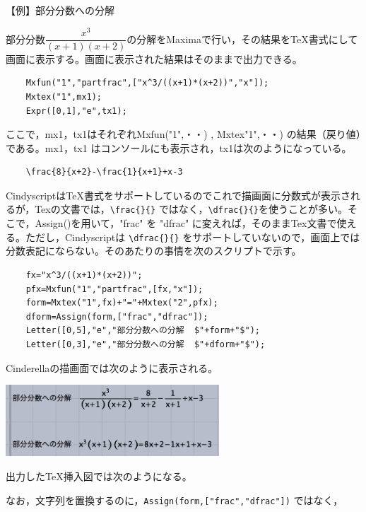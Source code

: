 \documentclass[papersize,a4paper,12pt,uplatex]{jsarticle}
\begin{document}
\begin{description}
\vspace{\baselineskip}
【例】部分分数への分解
\begin{spacing}{1.5}
  部分分数$\dfrac{x^3}{(x+1)(x+2)}$の分解をMaximaで行い，その結果をTeX書式にして画面に表示する。画面に表示された結果はそのまま\ketcindy で出力できる。
\end{spacing}
\begin{verbatim}
    Mxfun("1","partfrac",["x^3/((x+1)*(x+2))","x"]);
    Mxtex("1",mx1);
    Expr([0,1],"e",tx1);
\end{verbatim}
  ここで，mx1，tx1はそれぞれMxfun("1",・・) , Mxtex"1",・・) の結果（戻り値）である。mx1，tx1 はコンソールにも表示され，tx1は次のようになっている。
\begin{verbatim}
    \frac{8}{x+2}-\frac{1}{x+1}+x-3 
\end{verbatim}
  CindyscriptはTeX書式をサポートしているのでこれで描画面に分数式が表示されるが，Texの文書では，\verb|\frac{}{}| ではなく，\verb|\dfrac{}{}|を使うことが多い。そこで，Assign()を用いて，"frac" を "dfrac" に変えれば，そのままTex文書で使える。ただし，Cindyscriptは \verb|\dfrac{}{}| をサポートしていないので，画面上では分数表記にならない。そのあたりの事情を次のスクリプトで示す。
\begin{verbatim}
    fx="x^3/((x+1)*(x+2))";
    pfx=Mxfun("1","partfrac",[fx,"x"]);
    form=Mxtex("1",fx)+"="+Mxtex("2",pfx);
    dform=Assign(form,["frac","dfrac"]);
    Letter([0,5],"e","部分分数への分解  $"+form+"$");
    Letter([0,3],"e","部分分数への分解  $"+dform+"$");
\end{verbatim}
Cinderellaの描画面では次のように表示される。

\vspace{\baselineskip}
\hspace{20mm} \includegraphics[bb=0 0 347.02 116.01 , width=8cm]{Fig/mxtex01.pdf}
        
\vspace{\baselineskip}
出力したTeX挿入図では次のようになる。

 

なお，文字列を置換するのに，\verb|Assign(form,["frac","dfrac"])| ではなく，


\end{description}
\end{document}
